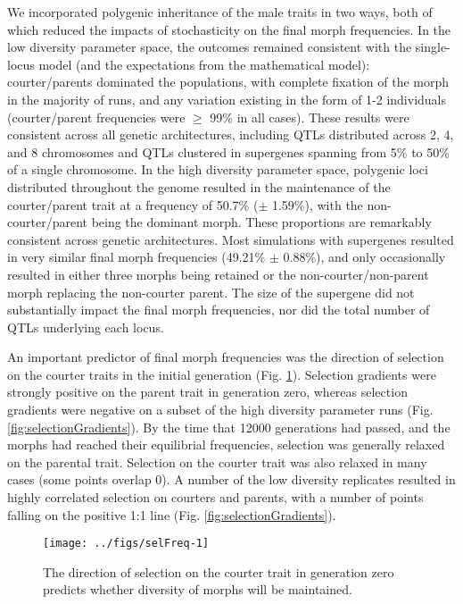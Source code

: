 \documentclass[
  11pt,
]{article}
\begin{document}
We incorporated polygenic inheritance of the male traits in two ways,
both of which reduced the impacts of stochasticity on the final morph
frequencies. In the low diversity parameter space, the outcomes remained
consistent with the single-locus model (and the expectations from the
mathematical model): courter/parents dominated the populations, with
complete fixation of the morph in the majority of runs, and any
variation existing in the form of 1-2 individuals (courter/parent
frequencies were \(\ge\) 99\% in all cases). These results were consistent
across all genetic architectures, including QTLs distributed across 2,
4, and 8 chromosomes and QTLs clustered in supergenes spanning from 5\%
to 50\% of a single chromosome. In the high diversity parameter space,
polygenic loci distributed throughout the genome resulted in the
maintenance of the courter/parent trait at a frequency of
50.7\%
(\(\pm\)
1.59\%),
with the non-courter/parent being the dominant morph. These proportions
are remarkably consistent across genetic architectures. Most simulations
with supergenes resulted in very similar final morph frequencies
(49.21\%
\(\pm\)
0.88\%),
and only occasionally resulted in either three morphs being retained or
the non-courter/non-parent morph replacing the non-courter parent. The
size of the supergene did not substantially impact the final morph
frequencies, nor did the total number of QTLs underlying each locus.

An important predictor of final morph frequencies was the direction of selection on the courter traits in the initial generation (Fig. \ref{fig:selFreq}).
Selection gradients were strongly positive on the parent trait in generation zero, whereas selection gradients were negative on a subset of the high diversity parameter runs (Fig. \ref{fig:selectionGradients}).
By the time that 12000 generations had passed, and the morphs had reached their equilibrial frequencies, selection was generally relaxed on the parental trait.
Selection on the courter trait was also relaxed in many cases (some points overlap 0).
A number of the low diversity replicates resulted in highly correlated selection on courters and parents, with a number of points falling on the positive 1:1 line (Fig. \ref{fig:selectionGradients}).

\begin{figure}[H]
\texttt{[image: ../figs/selFreq-1]} \caption{The direction of selection on the courter trait in generation zero predicts whether diversity of morphs will be maintained.}\label{fig:selFreq}
\end{figure}
\end{document}
